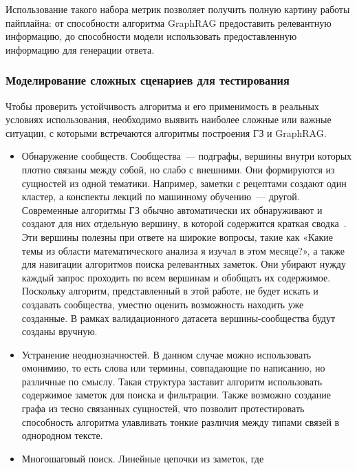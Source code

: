 Использование такого набора метрик позволяет получить полную картину
работы пайплайна: от способности алгоритма GraphRAG предоставить релевантную информацию,
до способности модели использовать предоставленную информацию для генерации ответа.

\subsubsection*{Моделирование сложных сценариев для тестирования}

Чтобы проверить устойчивость алгоритма и его применимость в реальных условиях использования,
необходимо выявить наиболее сложные или важные ситуации,
с которыми встречаются алгоритмы построения ГЗ и GraphRAG.

\begin{itemize}
      \item Обнаружение сообществ. Сообщества~--- подграфы,
            вершины внутри которых плотно связаны между собой, но слабо с внешними.
            Они формируются из сущностей из одной тематики. Например,
            заметки с рецептами создают один кластер,
            а конспекты лекций по машинному обучению~--- другой.
            Современные алгоритмы ГЗ обычно автоматически
            их обнаруживают и создают для них отдельную вершину,
            в которой содержится краткая сводка~\cite{Edge_2024}.
            Эти вершины полезны при ответе на широкие вопросы,
            такие как
            «Какие темы из области математического анализа я изучал в этом месяце?»,
            а также для навигации алгоритмов поиска релевантных заметок.
            Они убирают нужду каждый запрос проходить по всем вершинам и
            обобщать их содержимое.
            Поскольку алгоритм, представленный в этой работе,
            не будет искать и создавать сообщества,
            уместно оценить возможность находить уже созданные.
            В рамках валидационного датасета вершины-сообщества будут созданы вручную.
      \item Устранение неоднозначностей.
            В данном случае можно использовать омонимию,
            то есть слова или термины, совпадающие по написанию, но различные по смыслу.
            Такая структура заставит алгоритм использовать содержимое заметок для поиска и фильтрации.
            Также возможно создание графа из тесно связанных сущностей, что позволит
            протестировать способность алгоритма улавливать тонкие
            различия между типами связей в однородном тексте.
      \item Многошаговый поиск. Линейные цепочки из заметок, где

\end{itemize}
